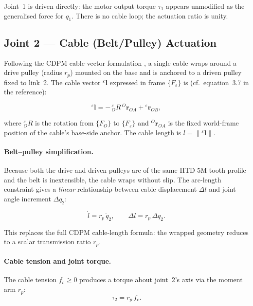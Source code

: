 \documentclass[12pt, a4paper]{article}
\theoremstyle{definition}
\newcommand{\FO}{\{F_O\}}      %
\newcommand{\FE}{\{F_\varepsilon\}} %
\begin{document}
Joint~1 is driven directly: the motor output torque $\tau_1$ appears
unmodified as the generalised force for $q_1$.  There is no cable loop;
the actuation ratio is unity.

\subsection{Joint 2 --- Cable (Belt/Pulley) Actuation}
\label{sec:act_j2}

Following the CDPM cable-vector formulation \cite{pott2018cable}, a single cable
wraps around a drive pulley (radius $r_p$) mounted on the base and is anchored to
a driven pulley fixed to link~2.  The cable vector ${}^\varepsilon\bm{l}$ expressed
in frame $\FE$ is (cf.\ equation~3.7 in the reference):

\begin{equation}
  \label{eq:cable_vec}
  {}^\varepsilon\bm{l}
  = -\,{}_O^\varepsilon R\,{}^O\bm{r}_{OA} + {}^\varepsilon\bm{r}_{OB},
\end{equation}

where ${}_O^\varepsilon R$ is the rotation from $\FO$ to $\FE$ and ${}^O\bm{r}_{OA}$
is the fixed world-frame position of the cable's base-side anchor.  The cable
length is $l = \|{}^\varepsilon\bm{l}\|$.

\paragraph{Belt--pulley simplification.}
Because both the drive and driven pulleys are of the same HTD-5M tooth profile and
the belt is inextensible, the cable wraps without slip.  The arc-length constraint
gives a \emph{linear} relationship between cable displacement $\Delta l$ and joint
angle increment $\Delta q_2$:

\begin{equation}
  \label{eq:cable_kin}
  \dot{l} = r_p\,\dot{q}_2 ,
  \qquad
  \Delta l = r_p\,\Delta q_2 .
\end{equation}

This replaces the full CDPM cable-length formula: the wrapped geometry reduces to a
scalar transmission ratio $r_p$.

\paragraph{Cable tension and joint torque.}
The cable tension $f_c \ge 0$ produces a torque about joint~2's axis via the moment
arm $r_p$:
\begin{equation}
  \label{eq:cable_torque}
  \tau_2 = r_p\,f_c .
\end{equation}
\end{document}
